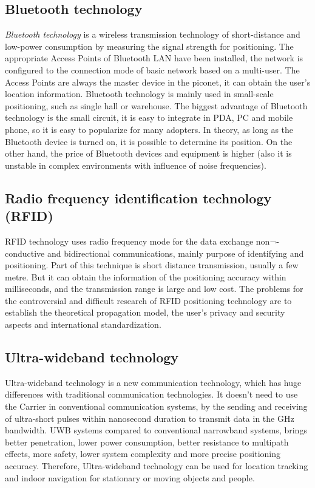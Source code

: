 \subsection{Bluetooth technology}

\textit{Bluetooth technology} is a wireless transmission technology of short-distance and low-power consumption by measuring the signal strength for positioning. The appropriate Access Points of Bluetooth LAN have been installed, the network is configured to the connection mode of basic network based on a multi-user. The Access Points are always the master device in the piconet, it can obtain the user's location information. Bluetooth technology is mainly used in small-scale positioning, such as single hall or warehouse. The biggest advantage of Bluetooth technology is the small circuit, it is easy to integrate in PDA, PC and mobile phone, so it is easy to popularize for many adopters. In theory, as long as the Bluetooth device is turned on, it is possible to determine its position. On the other hand, the price of Bluetooth devices and equipment is higher (also it is unstable in complex environments with influence of noise frequencies).    

\subsection{Radio frequency identification technology (RFID)}

RFID technology uses radio frequency mode for the data exchange non¬-conductive and bidirectional communications, mainly purpose of identifying and positioning. Part of this technique is short distance transmission, usually a few metre. But it can obtain the information of the positioning accuracy within milliseconds, and the transmission range is large and low cost. The problems for the controversial and difficult research of RFID positioning technology are to establish the theoretical propagation model, the user's privacy and security aspects and international standardization.   

\subsection{Ultra-wideband technology}

Ultra-wideband technology is a new communication technology, which has huge differences with traditional communication technologies\cite{DrRainerMautz2012}. It doesn’t need to use the Carrier in conventional communication systems, by the sending and receiving of ultra‐short pulses within nanosecond duration to transmit data in the GHz bandwidth. UWB systems compared to conventional narrowband systems, brings better penetration, lower power consumption, better resistance to multipath effects, more safety, lower system complexity and more precise positioning accuracy. Therefore, Ultra-wideband technology can be used for location tracking and indoor navigation for stationary or moving objects and people.    

